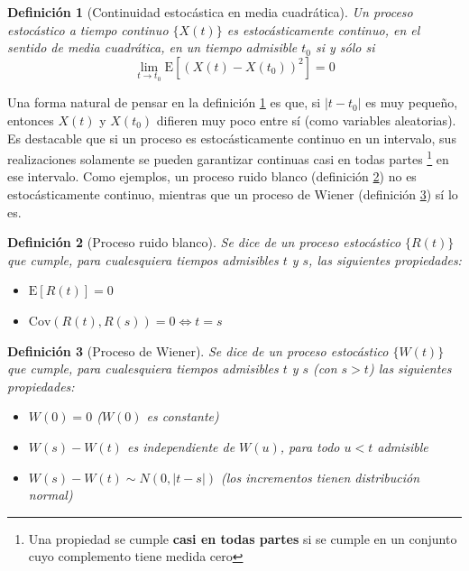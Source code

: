 \documentclass[12pt,a4paper]{mitthesis}
\newtheorem{defn}{Definici\'on}
\newcommand{\E}[1]{\mathrm{E}\left[ #1 \right]}
\newcommand{\Cov}[1]{\mathrm{Cov}\left( #1 \right)}
\newcommand{\abso}[1]{\left| #1 \right|}
\begin{document}
\begin{defn}[Continuidad estoc\'astica en media cuadr\'atica]
Un proceso estoc\'astico a tiempo continuo $\{ X(t) \}$ es estoc\'asticamente continuo, en el 
sentido de media cuadr\'atica, en un tiempo admisible $t_0$ si y s\'olo si
\begin{equation*}
\lim_{t \rightarrow t_0} \E{\left( X(t) - X(t_0) \right)^{2}} = 0
\end{equation*}
\label{cont_est}
\end{defn}

Una forma natural de pensar en la definici\'on \ref{cont_est} es que, si $\abso{t-t_0}$ es muy 
peque\~no, entonces $X(t)$ y $X(t_0)$ difieren muy poco entre s\'i (como variables aleatorias).
Es destacable que si un proceso es estoc\'asticamente continuo en un intervalo, sus realizaciones 
solamente se pueden garantizar continuas casi en todas partes \footnote{Una propiedad se cumple 
\textbf{casi en todas partes} si se cumple en un conjunto cuyo complemento tiene medida cero} en 
ese intervalo.
Como ejemplos, un proceso ruido blanco (definici\'on \ref{r_blanco}) no es estoc\'asticamente 
continuo, mientras que un proceso de Wiener (definici\'on \ref{r_wiener}) s\'i lo es.

\begin{defn}[Proceso ruido blanco]
Se dice de un proceso estoc\'astico $\{ R(t) \}$ que cumple, para cualesquiera tiempos admisibles
$t$ y $s$, las siguientes propiedades:
\begin{itemize}
\item $\E{R(t)}=0$
\item $\Cov{R(t),R(s)}=0 \Leftrightarrow t=s$ 
\end{itemize}
\label{r_blanco}
\end{defn}

\begin{defn}[Proceso de Wiener]
Se dice de un proceso estoc\'astico $\{ W(t) \}$ que cumple, para cualesquiera tiempos admisibles
$t$ y $s$ (con $s>t$) las siguientes propiedades:
\begin{itemize}
\item $W(0) = 0$ ($W(0)$ es constante)
\item $W(s)-W(t)$ es independiente de $W(u)$, para todo $u<t$ admisible
\item $W(s)-W(t) \sim N(0,\abso{t-s})$  (los incrementos tienen distribuci\'on normal)
\end{itemize}
\label{r_wiener}
\end{defn}
\end{document}

